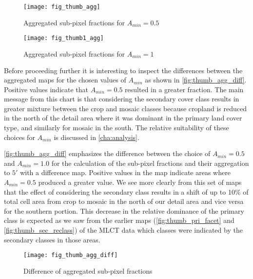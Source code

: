 \begin{figure}[hpt] 
\centering
  

\texttt{[image: fig\_thumb\_agg]}
 
\caption{Aggregated sub-pixel fractions for $A_{min}=0.5$}
\label{fig:thumb_agg}
\end{figure} 

\begin{figure}[hpt] 
\centering
  

\texttt{[image: fig\_thumb1\_agg]}
 
\caption{Aggregated sub-pixel fractions for $A_{min}=1$}
\label{fig:thumb1_agg}
\end{figure} 


Before proceeding further it is interesting to inspect the differences
between the aggregated maps for the chosen values of $A_{min}$ as
shown in \autoref{fig:thumb_agg_diff}.  Positive values indicate that
$A_{min} = 0.5$ resulted in a greater fraction.  The main message from
this chart is that considering the secondary cover class results in
greater mixture between the crop and mosaic classes because cropland
is reduced in the north of the detail area where it was dominant in
the primary land cover type, and similarly for mosaic in the south.
The relative suitability of these choices for $A_{min}$ is discussed
in \autoref{cha:analysis}.



\autoref{fig:thumb_agg_diff} emphasizes the difference between the
choice of $A_{min}=0.5$ and $A_{min}=1.0$ for the calculation of the
sub-pixel fractions and their aggregation to $5'$ with a difference
map.  Positive values in the map indicate areas where $A_{min}=0.5$
produced a greater value.  We see more clearly from this set of maps
that the effect of considering the secondary class results in a shift
of up to 10\% of total cell area from crop to mosaic in the north of
our detail area and vice versa for the southern portion.  This
decrease in the relative dominance of the primary class is expected as
we saw from the earlier maps (\autoref{fig:thumb_pri_facet} and
\autoref{fig:thumb_sec_reclass}) of the MLCT data which classes were
indicated by the secondary classes in those areas.

\begin{figure}[hpt]
\centering
  

\texttt{[image: fig\_thumb\_agg\_diff]}
 
\caption{ Difference of aggregated sub-pixel fractions}
\label{fig:thumb_agg_diff}
\end{figure} 

